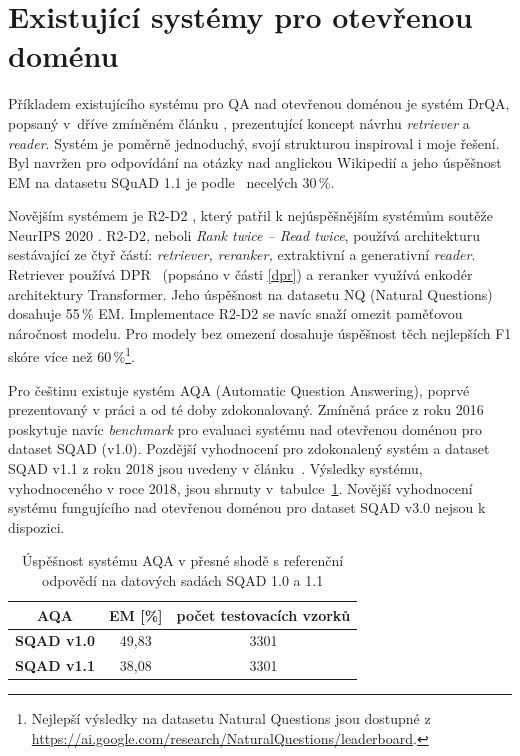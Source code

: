 \section{Existující systémy pro otevřenou doménu}
\label{existing_work}
Příkladem existujícího systému pro QA nad otevřenou doménou je systém DrQA, popsaný v~dříve zmíněném článku \cite{drQA}, prezentující koncept návrhu \emph{retriever} a \emph{reader}. Systém je poměrně jednoduchý, svojí strukturou inspiroval i moje řešení. Byl navržen pro odpovídání na otázky nad anglickou Wikipedií a jeho úspěšnost EM na datasetu SQuAD 1.1 je podle~\cite{drQA} necelých 30\,\%.\par
Novějším systémem je R2-D2 \cite{fajcik2021pruning}, který patřil k nejúspěšnějším systémům soutěže Neur\-IPS 2020 \cite{min2021neurips}. R2-D2, neboli \textit{Rank twice -- Read twice}, používá architekturu sestávající ze čtyř částí: \emph{retriever, reranker, }extraktivní a generativní \emph{reader}. Retriever používá DPR~\cite{dpr} (popsáno v části \ref{dpr}) a reranker využívá enkodér architektury Transformer. Jeho úspěšnost na datasetu NQ (Natural Questions) dosahuje 55\,\% EM.
Implementace \mbox{R2-D2} se navíc snaží omezit paměťovou náročnost modelu. Pro modely bez omezení dosahuje úspěšnost těch nejlepších F1 skóre více než 60\,\%\footnote{Nejlepší výsledky na datasetu Natural Questions jsou dostupné z  \url{https://ai.google.com/research/NaturalQuestions/leaderboard}.}.\par\medskip
Pro češtinu existuje systém AQA (Automatic Question Answering), poprvé prezentovaný v práci \cite{aqa} a od té doby zdokonalovaný. Zmíněná práce z roku 2016 poskytuje navíc \textit{benchmark} pro evaluaci systému nad otevřenou doménou pro dataset SQAD (v1.0). Pozdější vyhodnocení pro zdokonalený systém a dataset SQAD v1.1 z roku 2018 jsou uvedeny v článku~\cite{aqa2018}. Výsledky systému, vyhodnoceného v roce 2018, jsou shrnuty v~tabulce~\ref{tab:aqa_benchmark}. Novější vyhodnocení systému fungujícího nad otevřenou doménou pro dataset SQAD v3.0 nejsou k dispozici.
\begin{table}[H]
\centering
    \begin{tabular}{|l|c|c|}
    \hline
    \multicolumn{1}{|c|}{{\textbf{AQA}}} & EM [\%]    & \multicolumn{1}{l|}{počet testovacích vzorků} \\ \hline
    \textbf{SQAD v1.0}                       & 49,83 & 3301                                         \\ \hline
    \textbf{SQAD v1.1}                       & 38,08 & 3301                                         \\ \hline
    \end{tabular}
\caption{Úspěšnost systému AQA v přesné shodě s referenční odpovědí na datových sadách SQAD 1.0 a 1.1}
\label{tab:aqa_benchmark}
\end{table}

